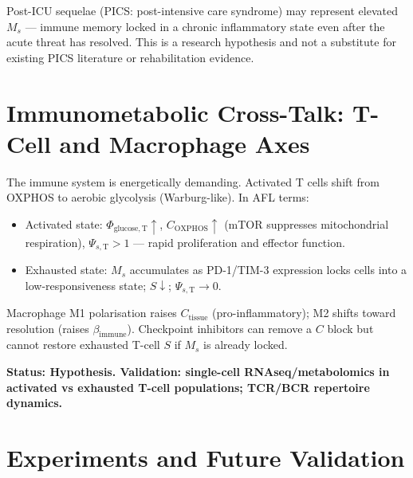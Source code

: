 \documentclass[12pt,a4paper]{article}
\begin{document}
Post-ICU sequelae (PICS: post-intensive care syndrome) may represent elevated $M_s$ — immune memory locked in a chronic inflammatory state even after the acute threat has resolved. This is a research hypothesis and not a substitute for existing PICS literature or rehabilitation evidence.

\section{Immunometabolic Cross-Talk: T-Cell and Macrophage Axes}

The immune system is energetically demanding. Activated T cells shift from OXPHOS to aerobic glycolysis (Warburg-like). In AFL terms:
\begin{itemize}
    \item Activated state: $\Phi_{\mathrm{glucose,T}} \uparrow$, $C_{\mathrm{OXPHOS}} \uparrow$ (mTOR suppresses mitochondrial respiration), $\Psi_{s,\mathrm{T}} > 1$ — rapid proliferation and effector function.
    \item Exhausted state: $M_s$ accumulates as PD-1/TIM-3 expression locks cells into a low-responsiveness state; $S \downarrow$; $\Psi_{s,\mathrm{T}} \to 0$.
\end{itemize}

Macrophage M1 polarisation raises $C_{\mathrm{tissue}}$ (pro-inflammatory); M2 shifts toward resolution (raises $\beta_{\mathrm{immune}}$). Checkpoint inhibitors can remove a $C$ block but cannot restore exhausted T-cell $S$ if $M_s$ is already locked.

\textbf{Status: Hypothesis. Validation: single-cell RNAseq/metabolomics in activated vs exhausted T-cell populations; TCR/BCR repertoire dynamics.}

\section{Experiments and Future Validation}
\end{document}
